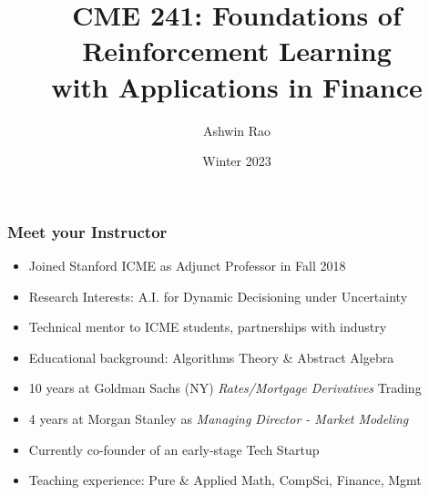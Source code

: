 \documentclass[handout]{beamer}
\title[``RL for Finance'' course]{CME 241: Foundations of Reinforcement Learning \\ with Applications in Finance} %
\author{Ashwin Rao} %
\institute[Stanford] %
{ICME, Stanford University
}
\date{Winter 2023} %
\begin{document}
\begin{frame}
\titlepage %
\end{frame}


\begin{frame}
\frametitle{Meet your Instructor}
\pause
\begin{itemize}[<+->]
\item Joined Stanford ICME as Adjunct Professor in Fall 2018
\item Research Interests: A.I. for Dynamic Decisioning under Uncertainty
\item Technical mentor to ICME students, partnerships with industry
\item Educational background: Algorithms Theory \& Abstract Algebra
\item 10 years at Goldman Sachs (NY) {\em Rates/Mortgage Derivatives} Trading
\item 4 years at Morgan Stanley as {\em Managing Director - Market Modeling}
\item Currently co-founder of an early-stage Tech Startup
\item Teaching experience: Pure \& Applied Math, CompSci, Finance, Mgmt
\end{itemize}
\end{frame}
\end{document}

